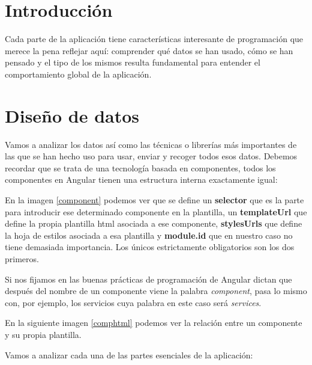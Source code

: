 \section{Introducción}\label{introducciondiseno}
Cada parte de la aplicación tiene características interesante de programación que merece la pena reflejar aquí: comprender qué datos se han usado, cómo se han pensado y el tipo de los mismos resulta fundamental para entender el comportamiento global de la aplicación.

\section{Diseño de datos}\label{datos}
Vamos a analizar los datos así como las técnicas o librerías más importantes de las que se han hecho uso para usar, enviar y recoger todos esos datos. Debemos recordar que se trata de una tecnología basada en componentes, todos los componentes en Angular tienen una estructura interna exactamente igual:

\label{component}

En la  imagen \ref{component} podemos ver que se define un \textbf{selector} que es la parte para introducir ese determinado componente en la plantilla, un \textbf{templateUrl} que define la propia plantilla html asociada a ese componente, \textbf{stylesUrls} que define la hoja de estilos asociada a esa plantilla y \textbf{module.id} que en nuestro caso no tiene demasiada importancia.  Los únicos estrictamente obligatorios son los dos primeros.

Si nos fijamos en las buenas prácticas de programación de Angular dictan que después del nombre de un componente viene la palabra \emph{component}, pasa lo mismo con, por ejemplo, los servicios cuya palabra en este caso será \emph{services}.

En la siguiente imagen \ref{comphtml} podemos ver la relación entre un componente y su propia plantilla.

\label{comphtml}


Vamos a analizar cada una de las partes esenciales de la aplicación:


